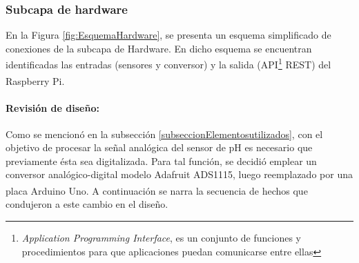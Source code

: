                 
            \subsubsection{Subcapa de hardware} 
                \par En la Figura \ref{fig:EsquemaHardware}, se presenta un esquema simplificado de conexiones de la subcapa de Hardware. En dicho esquema se encuentran identificadas las entradas (sensores y conversor) y la salida (API\footnote{\textit{Application Programming Interface}, es un conjunto de funciones y procedimientos para que aplicaciones puedan comunicarse entre ellas} REST) del Raspberry\textsuperscript{\textregistered} Pi.
                
                \paragraph{Revisión de diseño:}
                 Como se mencionó en la subsección \ref{subseccionElementosutilizados}, con el objetivo de procesar la señal analógica del sensor de pH es necesario que previamente ésta sea digitalizada. Para tal función, se decidió emplear un conversor analógico-digital modelo Adafruit ADS1115, luego reemplazado por una placa Arduino\textsuperscript{\textregistered} Uno. A continuación se narra la secuencia de hechos que condujeron a este cambio en el diseño.
